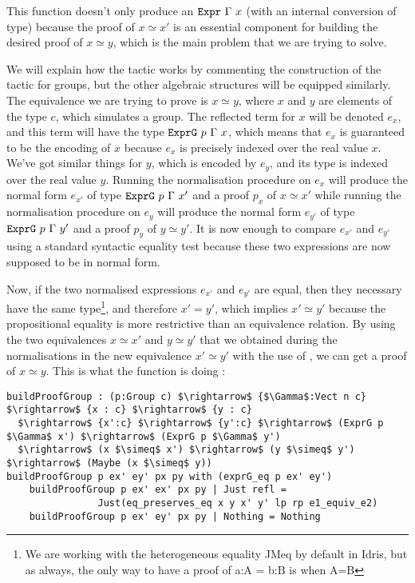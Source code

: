 This function doesn't only produce an ${\mbox{\texttt{Expr}}}\ \Gamma\ x$ (with an internal conversion of type) because the proof of $x \simeq x'$ is an essential component for building the desired proof of $x \simeq y$, which is the main problem that we are trying to solve.


We will explain how the tactic works by commenting the construction of the tactic for groups, but the other algebraic structures will be equipped similarly. The equivalence we are trying to prove is $x \simeq y$, where $x$ and $y$ are elements of the type $c$, which  simulates a group. The reflected term for $x$ will be denoted $e_x$, and this term will have the type ${\mbox{\texttt{ExprG}}}\ p\ \Gamma\ x$, which means that $e_x$ is guaranteed to be the encoding of $x$ because $e_x$ is precisely indexed over the real value $x$.
We've got similar things for $y$, which is encoded by $e_y$, and its type is indexed over the real value $y$.
Running the normalisation procedure on $e_x$ will produce the normal form $e_{x'}$ of type ${\mbox{\texttt{ExprG}}}\ p\ \Gamma\ x'$ and a proof $p_x$ of $x \simeq x'$ while running the normalisation procedure on $e_y$ will produce the normal form $e_{y'}$ of type ${\mbox{\texttt{ExprG}}}\ p\ \Gamma\ y'$ and a proof $p_y$ of $y \simeq y'$.
It is now enough to compare $e_{x'}$ and $e_{y'}$ using a standard syntactic equality test  because these two expressions are now supposed to be in normal form.

Now, if the two normalised expressions $e_{x'}$ and $e_{y'}$ are equal, then they necessary have the same type\footnote{We are working with the heterogeneous equality JMeq by default in Idris, but as always, the only way to have a proof of a:A = b:B is when A=B}, and therefore $x'=y'$, which implies $x' \simeq y'$ because the propositional equality is more restrictive than an equivalence relation.
By using the two equivalences $x \simeq x'$ and $y \simeq y'$ that we obtained during the normalisations in the new equivalence $x' \simeq y'$ with the use of , we can get a proof of $x \simeq y$. This is what the function  is doing :

\begin{lstlisting}
buildProofGroup : (p:Group c) $\rightarrow$ {$\Gamma$:Vect n c} $\rightarrow$ {x : c} $\rightarrow$ {y : c} 
  $\rightarrow$ {x':c} $\rightarrow$ {y':c} $\rightarrow$ (ExprG p $\Gamma$ x') $\rightarrow$ (ExprG p $\Gamma$ y') 
  $\rightarrow$ (x $\simeq$ x') $\rightarrow$ (y $\simeq$ y') $\rightarrow$ (Maybe (x $\simeq$ y))
buildProofGroup p ex' ey' px py with (exprG_eq p ex' ey')
    buildProofGroup p ex' ex' px py | Just refl = 
                Just(eq_preserves_eq x y x' y' lp rp e1_equiv_e2)
    buildProofGroup p ex' ey' px py | Nothing = Nothing
\end{lstlisting}


